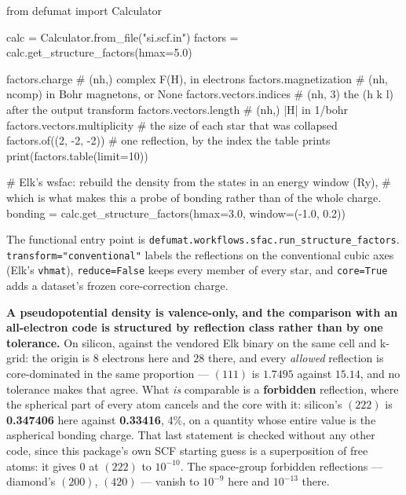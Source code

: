 \documentclass[11pt,a4paper]{article}
\newcommand{\code}[1]{\texttt{\small #1}}
\begin{document}
\begin{pycode}
from defumat import Calculator

calc = Calculator.from_file("si.scf.in")
factors = calc.get_structure_factors(hmax=5.0)

factors.charge               # (nh,) complex F(H), in electrons
factors.magnetization        # (nh, ncomp) in Bohr magnetons, or None
factors.vectors.indices      # (nh, 3) the (h k l) after the output transform
factors.vectors.length       # (nh,) |H| in 1/bohr
factors.vectors.multiplicity # the size of each star that was collapsed
factors.of((2, -2, -2))      # one reflection, by the index the table prints
print(factors.table(limit=10))

# Elk's wsfac: rebuild the density from the states in an energy window (Ry),
# which is what makes this a probe of bonding rather than of the whole charge.
bonding = calc.get_structure_factors(hmax=3.0, window=(-1.0, 0.2))
\end{pycode}

The functional entry point is \code{defumat.workflows.sfac.run\_structure\_factors}.
\code{transform="conventional"} labels the reflections on the conventional cubic
axes (Elk's \code{vhmat}), \code{reduce=False} keeps every member of every star,
and \code{core=True} adds a dataset's frozen core-correction charge.

\textbf{A pseudopotential density is valence-only, and the comparison with an
all-electron code is structured by reflection class rather than by one
tolerance.} On silicon, against the vendored Elk binary on the same cell and
k-grid: the origin is $8$ electrons here and $28$ there, and every
\emph{allowed} reflection is core-dominated in the same proportion --- $(111)$ is
$1.7495$ against $15.14$, and no tolerance makes that agree. What \emph{is}
comparable is a \textbf{forbidden} reflection, where the spherical part of every
atom cancels and the core with it: silicon's $(222)$ is \textbf{0.347406} here
against \textbf{0.33416}, 4\%, on a quantity whose entire value is the
aspherical bonding charge. That last statement is checked without any other
code, since this package's own SCF starting guess is a superposition of free
atoms: it gives $0$ at $(222)$ to $10^{-10}$. The space-group forbidden
reflections --- diamond's $(200)$, $(420)$ --- vanish to $10^{-9}$ here and
$10^{-13}$ there.
\end{document}
